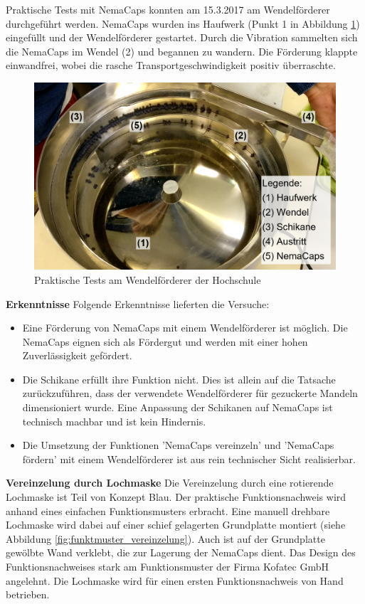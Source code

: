 Praktische Tests mit NemaCaps konnten am 15.3.2017 am Wendelförderer durchgeführt werden. NemaCaps wurden ins Haufwerk (Punkt 1 in Abbildung \ref{fig:wendelfoerderer}) eingefüllt und der Wendelförderer gestartet. Durch die Vibration sammelten sich die NemaCaps im Wendel (2) und begannen zu wandern. Die Förderung klappte einwandfrei, wobei die rasche Transportgeschwindigkeit positiv überraschte. 
\begin{figure}[H]
	\includegraphics[width=1\textwidth]{Illustrationen/5-Konzept/wendelfoerderer.PNG}
	\caption{Praktische Tests am Wendelförderer der Hochschule}
	\label{fig:wendelfoerderer}
\end{figure}
\textbf{Erkenntnisse}
\newline
Folgende Erkenntnisse lieferten die Versuche:
\begin{itemize}
	\item Eine Förderung von NemaCaps mit einem Wendelförderer ist möglich. Die NemaCaps eignen sich als Fördergut und werden mit einer hohen Zuverlässigkeit gefördert.
	
	\item Die Schikane erfüllt ihre Funktion nicht. Dies ist allein auf die Tatsache zurückzuführen, dass der verwendete  Wendelförderer für gezuckerte Mandeln dimensioniert wurde. Eine Anpassung der Schikanen auf NemaCaps ist technisch machbar und ist kein Hindernis.
	
	\item Die Umsetzung der Funktionen 'NemaCaps vereinzeln' und 'NemaCaps fördern' mit einem Wendelförderer ist aus rein technischer Sicht realisierbar.
\end{itemize} 
\newpage
\textbf{Vereinzelung durch Lochmaske}
\newline
Die Vereinzelung durch eine rotierende Lochmaske ist Teil von Konzept Blau. Der praktische Funktionsnachweis wird anhand eines einfachen Funktionsmusters erbracht. Eine manuell drehbare Lochmaske wird dabei auf einer schief gelagerten Grundplatte montiert (siehe Abbildung \ref{fig:funktmuster_vereinzelung}). Auch ist auf der Grundplatte gewölbte Wand verklebt, die zur Lagerung der NemaCaps dient. Das Design des Funktionsnachweises stark am Funktionsmuster der Firma Kofatec GmbH angelehnt. Die Lochmaske wird für einen ersten Funktionsnachweis von Hand betrieben.
